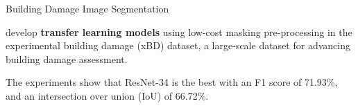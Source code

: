 \documentclass[aspectratio=169]{beamer}
\begin{document}
\begin{frame}{Building Damage Image Segmentation}
	\begin{vfilleditems}
	\item \citet{toba2023masking}  develop \textbf{transfer learning models} using low-cost masking pre-processing in the experimental building damage (xBD) dataset, a large-scale dataset for advancing building damage assessment.
	\item The experiments show that ResNet-34 is the best with an F1 score of 71.93\%, and an intersection over union (IoU) of 66.72\%.
\end{vfilleditems}				
\end{frame}


%
%
%
\end{document}
